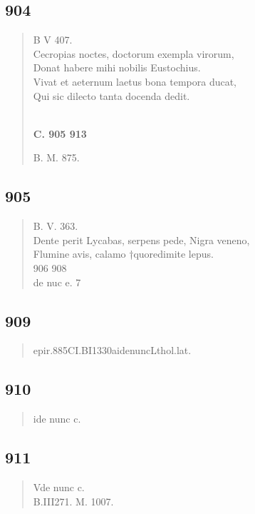 \documentclass[11pt, a4paper]{report}
\begin{document}
            \subsection*{904}
      \begin{verse}
      B V 407. \\ Cecropias noctes, doctorum exempla virorum, \\ Donat habere mihi nobilis Eustochius. \\ Vivat et aeternum laetus bona tempora ducat, \\ Qui sic dilecto tanta docenda dedit. \\ 
        ﻿\pagebreak 
     \marginpar{[342]} \begin{center} \textbf{C. 905 913} \end{center}B. M. 875. \\ 
      \end{verse}
  
            \subsection*{905}
      \begin{verse}
      B. V. 363. \\ Dente perit Lycabas, serpens pede, Nigra veneno, \\ Flumine avis, calamo †quoredimite lepus. \\ 906 908 \\ de nuc e. 7 \\ 
      \end{verse}
  
            \subsection*{909}
      \begin{verse}
      epir.885CI.BI1330aidenuncLthol.lat. \\ 
      \end{verse}
  
            \subsection*{910}
      \begin{verse}
      ide nunc c. \\ 
      \end{verse}
  
            \subsection*{911}
      \begin{verse}
      Vde nunc c. \\ B.III271. M. 1007. \\ 
      \end{verse}
  
\end{document}
